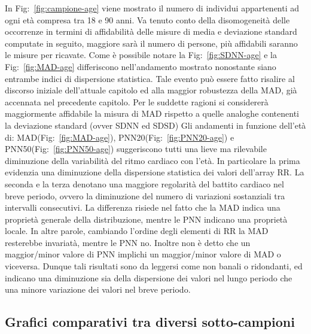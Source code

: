 \documentclass[a4paper, 12pt]{book}
\begin{document}
In Fig:~\ref{fig:campione-age} viene mostrato il numero di individui appartenenti ad ogni età compresa tra 18 e 90 anni. 
Va tenuto conto della disomogeneità delle occorrenze in termini di affidabilità delle misure di media e deviazione standard computate in seguito, maggiore sarà il numero di persone, più affidabili saranno le misure per ricavate.
Come è possibile notare la Fig:~\ref{fig:SDNN-age} e la Fig:~\ref{fig:MAD-age} differiscono nell'andamento mostrato nonostante siano entrambe indici di dispersione statistica.
Tale evento può essere fatto risalire al discorso iniziale dell'attuale capitolo ed alla maggior robustezza della MAD, già accennata nel precedente capitolo. 
Per le suddette ragioni si considererà maggiormente affidabile la misura di MAD rispetto a quelle analoghe contenenti la deviazione standard (ovver SDNN ed SDSD)
Gli andamenti in funzione dell'età di: MAD(Fig:~\ref{fig:MAD-age}), PNN20(Fig:~\ref{fig:PNN20-age}) e PNN50(Fig:~\ref{fig:PNN50-age}) suggeriscono tutti una lieve ma rilevabile diminuzione della variabilità del ritmo cardiaco con l'età.
In particolare la prima evidenzia una diminuzione della dispersione statistica dei valori dell'array RR.
La seconda e la terza denotano una maggiore regolarità del battito cardiaco nel breve periodo, ovvero la diminuzione del numero di variazioni sostanziali tra intervalli consecutivi.
La differenza risiede nel fatto che la MAD indica una proprietà generale della distribuzione, mentre le PNN indicano una proprietà locale.
In altre parole, cambiando l'ordine degli elementi di RR la MAD resterebbe invariatà, mentre le PNN no.
Inoltre non è detto che un maggior/minor valore di PNN implichi un maggior/minor valore di MAD o viceversa.
Dunque tali risultati sono da leggersi come non banali o ridondanti, ed indicano una diminuzione sia della dispersione dei valori nel lungo periodo che una minore variazione dei valori nel breve periodo.


\subsection{Grafici comparativi tra diversi sotto-campioni}
\end{document}
